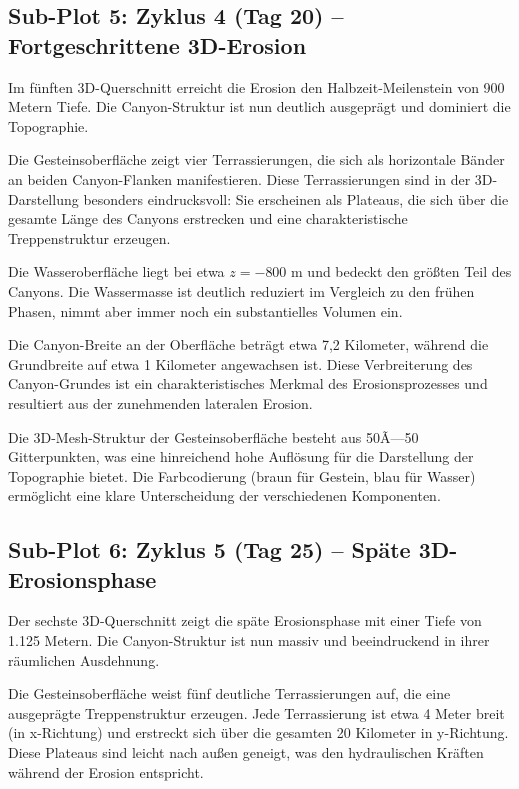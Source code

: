 ﻿\documentclass[12pt,a4paper]{report}
\begin{document}
\subsection{Sub-Plot 5: Zyklus 4 (Tag 20) -- Fortgeschrittene 3D-Erosion}

Im fünften 3D-Querschnitt erreicht die Erosion den Halbzeit-Meilenstein von 900 Metern Tiefe. Die Canyon-Struktur ist nun deutlich ausgeprägt und dominiert die Topographie.

Die Gesteinsoberfläche zeigt vier Terrassierungen, die sich als horizontale Bänder an beiden Canyon-Flanken manifestieren. Diese Terrassierungen sind in der 3D-Darstellung besonders eindrucksvoll: Sie erscheinen als Plateaus, die sich über die gesamte Länge des Canyons erstrecken und eine charakteristische Treppenstruktur erzeugen.

Die Wasseroberfläche liegt bei etwa $z = -800$ m und bedeckt den größten Teil des Canyons. Die Wassermasse ist deutlich reduziert im Vergleich zu den frühen Phasen, nimmt aber immer noch ein substantielles Volumen ein.

Die Canyon-Breite an der Oberfläche beträgt etwa 7,2 Kilometer, während die Grundbreite auf etwa 1 Kilometer angewachsen ist. Diese Verbreiterung des Canyon-Grundes ist ein charakteristisches Merkmal des Erosionsprozesses und resultiert aus der zunehmenden lateralen Erosion.

Die 3D-Mesh-Struktur der Gesteinsoberfläche besteht aus 50Ã—50 Gitterpunkten, was eine hinreichend hohe Auflösung für die Darstellung der Topographie bietet. Die Farbcodierung (braun für Gestein, blau für Wasser) ermöglicht eine klare Unterscheidung der verschiedenen Komponenten.

\subsection{Sub-Plot 6: Zyklus 5 (Tag 25) -- Späte 3D-Erosionsphase}

Der sechste 3D-Querschnitt zeigt die späte Erosionsphase mit einer Tiefe von 1.125 Metern. Die Canyon-Struktur ist nun massiv und beeindruckend in ihrer räumlichen Ausdehnung.

Die Gesteinsoberfläche weist fünf deutliche Terrassierungen auf, die eine ausgeprägte Treppenstruktur erzeugen. Jede Terrassierung ist etwa 4 Meter breit (in x-Richtung) und erstreckt sich über die gesamten 20 Kilometer in y-Richtung. Diese Plateaus sind leicht nach außen geneigt, was den hydraulischen Kräften während der Erosion entspricht.
\end{document}
